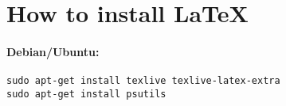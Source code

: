 \chapter{How to install \LaTeX}


\subsubsection*{Debian/Ubuntu:}
\begin{verbatim}
sudo apt-get install texlive texlive-latex-extra
sudo apt-get install psutils
\end{verbatim}

